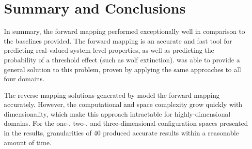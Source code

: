 \section{Summary and Conclusions}

In summary, the forward mapping performed exceptionally well in comparison to the baselines provided.
The forward mapping is an accurate and fast tool for predicting real-valued system-level properties, as well as predicting the probability of a threshold effect (such as wolf extinction).
\fw was able to provide a general solution to this problem, proven by applying the same approaches to all four domains.

The reverse mapping solutions generated by \fw model the forward mapping accurately.
However, the computational and space complexity grow quickly with dimensionality, which make this approach intractable for highly-dimensional domains.
For the one-, two-, and three-dimensional configuration spaces presented in the results, granularities of 40 produced accurate results within a reasonable amount of time.



